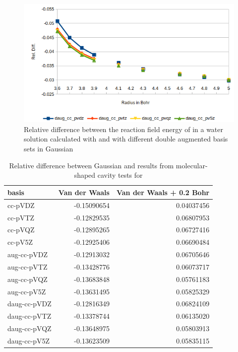 \documentclass[../Thesis.tex]{subfiles}
\begin{document}
\begin{figure}[!htb]
  \centering
    \includegraphics[width=\linewidth]{img/cyandaugreldiff.png}
  \caption[Relative difference between  and double augmented Gaussian results]{Relative difference between the reaction field energy of  in a water solution calculated with \mrchem
  and with different double augmented basis sets in Gaussian}
  \label{fig:cyanreldiffdaug}
\end{figure}


\begin{table}[htbp]
\caption[Relative difference between Gaussian and \mrchem results for ]{Relative difference between Gaussian and \mrchem results from molecular-shaped cavity  tests for }
\begin{tabular}{l|r|r}
basis & \multicolumn{1}{l|}{Van der Waals} & \multicolumn{1}{l|}{Van der Waals + 0.2 Bohr} \\ \hline
cc-pVDZ & -0.15090654 & 0.04037456 \\
cc-pVTZ & -0.12829535 & 0.06807953 \\
cc-pVQZ & -0.12895265 & 0.06727416 \\
cc-pV5Z & -0.12925406 & 0.06690484 \\ \hline
aug-cc-pVDZ & -0.12913032 & 0.06705646 \\
aug-cc-pVTZ & -0.13428776 & 0.06073717 \\
aug-cc-pVQZ & -0.13683848 & 0.05761183 \\
aug-cc-pV5Z & -0.13631495 & 0.05825329 \\ \hline
daug-cc-pVDZ & -0.12816349 & 0.06824109 \\
daug-cc-pVTZ & -0.13378744 & 0.06135020 \\
daug-cc-pVQZ & -0.13648975 & 0.05803913 \\
daug-cc-pV5Z & -0.13623509 & 0.05835115 \\
\end{tabular}
\label{tab:watabcreldiff}
\end{table}
\end{document}
